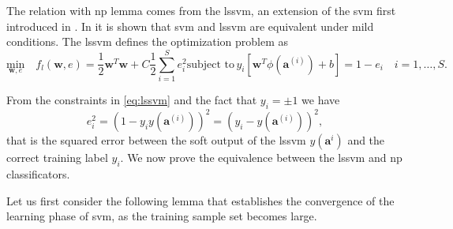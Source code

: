 \documentclass[draftcls,onecolumn,12pt]{IEEEtran}
\begin{document}

The relation with \ac{np} lemma comes from the \ac{lssvm}, an extension of the \ac{svm} first introduced in \cite{Suykens1999}. In \cite{Yevs} it is shown that  \ac{svm} and \ac{lssvm} are equivalent under mild conditions. The \ac{lssvm} defines the optimization problem as
\begin{subequations}
\label{eq:lssvm}
\begin{equation}
	 \underset{\mathbf{w},e}{\text{min}} \quad f_l(\mathbf{w},e) = \frac{1}{2} \mathbf{w}^T \mathbf{w} + C \frac{1}{2} \sum_{i=1}^S e_i ^2 
\end{equation}
\begin{equation}
\label{eq:stpart}
	 \text{subject to}\,  y_i[\mathbf{w}^T \phi (\mathbf{a}^{(i)}) + b] = 1- e_i\quad i = 1 ,\dots,S.
\end{equation}
\end{subequations}

From the constraints in \eqref{eq:lssvm} and the fact that $y_i = \pm 1$ we have
\begin{equation}
\label{eq:els}
		e_i^2 = (1 - y_iy(\mathbf{a}^{(i)}) )^2 = (y_i - y(\mathbf{a}^{(i)}))^2,
\end{equation}
that is the squared error between the soft output of the \ac{lssvm} $y(\mathbf{a}^i)$ and the correct training label $y_i$. We now prove the equivalence between the \ac{lssvm} and \ac{np} classificators. 

Let us first consider the following lemma that establishes the convergence of the learning phase of \ac{svm}, as the training sample set becomes large.
\end{document}

